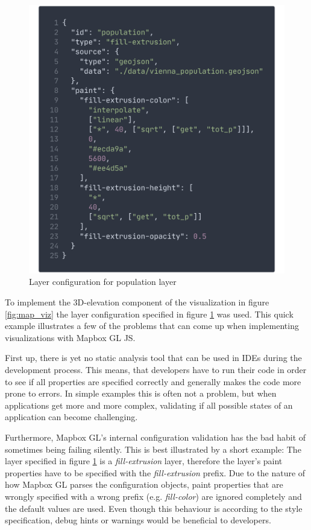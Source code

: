 \documentclass[conference]{IEEEtran}
\begin{document}
\begin{figure}
    \centering
    \includegraphics[width=\columnwidth]{img/vienna-mapbox.png}
    \caption{Layer configuration for population layer}
    \label{fig:mapbox-config}
\end{figure}
To implement the 3D-elevation component of the visualization in figure \ref{fig:map_viz} the layer configuration specified in figure \ref{fig:mapbox-config} was used. This quick example illustrates a few of the problems that can come up when implementing visualizations with Mapbox GL JS. 

First up, there is yet no static analysis tool that can be used in IDEs during the development process. This means, that developers have to run their code in order to see if all properties are specified correctly and generally makes the code more prone to errors. 
In simple examples this is often not a problem, but when applications get more and more complex, validating if all possible states of an application can become challenging. 

Furthermore, Mapbox GL's internal configuration validation has the bad habit of sometimes being failing silently. This is best illustrated by a short example: The layer specified in figure \ref{fig:mapbox-config} is a \textit{fill-extrusion} layer, therefore the layer's paint properties have to be specified with the \textit{fill-extrusion} prefix\cite{mapbox2020style}. 
Due to the nature of how Mapbox GL parses the configuration objects, paint properties that are wrongly specified with a wrong prefix (e.g. \textit{fill-color}) are ignored completely and the default values are used. Even though this behaviour is according to the style specification, debug hints or warnings would be beneficial to developers.
\end{document}
